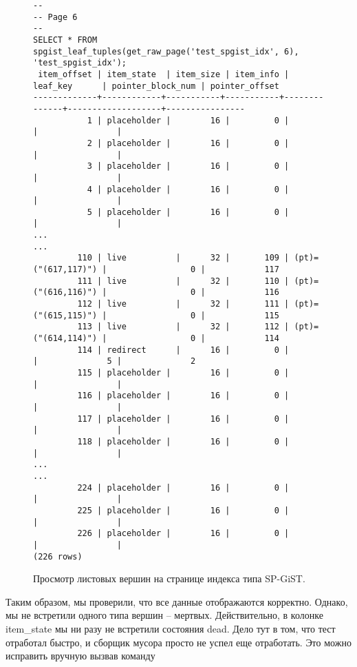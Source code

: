 \documentclass[12pt,oneside]{amsart}
\begin{document}
\begin{figure}[ht]
\begin{lstlisting}
--
-- Page 6
--
SELECT * FROM spgist_leaf_tuples(get_raw_page('test_spgist_idx', 6), 'test_spgist_idx');
 item_offset | item_state  | item_size | item_info |      leaf_key      | pointer_block_num | pointer_offset
-------------+------------+-----------+-----------+--------------+-------------------+----------------
           1 | placeholder |        16 |         0 |                       |                |
           2 | placeholder |        16 |         0 |                       |                |
           3 | placeholder |        16 |         0 |                       |                |
           4 | placeholder |        16 |         0 |                       |                |
           5 | placeholder |        16 |         0 |                       |                |
...
...
         110 | live          |      32 |       109 | (pt)=("(617,117)") |                 0 |            117
         111 | live          |      32 |       110 | (pt)=("(616,116)") |                 0 |            116
         112 | live          |      32 |       111 | (pt)=("(615,115)") |                 0 |            115
         113 | live          |      32 |       112 | (pt)=("(614,114)") |                 0 |            114
         114 | redirect      |      16 |         0 |                       |              5 |              2
         115 | placeholder |        16 |         0 |                       |                |
         116 | placeholder |        16 |         0 |                       |                |
         117 | placeholder |        16 |         0 |                       |                |
         118 | placeholder |        16 |         0 |                       |                |
...
...
         224 | placeholder |        16 |         0 |                       |                |
         225 | placeholder |        16 |         0 |                       |                |
         226 | placeholder |        16 |         0 |                       |                |
(226 rows)
\end{lstlisting}
\caption{Просмотр листовых вершин на странице индекса типа SP-GiST.}\label{test_leaf}
\end{figure}

Таким образом, мы проверили, что все данные отображаются корректно. Однако, мы не встретили одного типа вершин -- мертвых. Действительно, в колонке item\_state мы ни разу не встретили состояния dead. Дело тут в том, что тест отработал быстро, и сборщик мусора просто не успел еще отработать. Это можно исправить вручную вызвав команду
\end{document}
